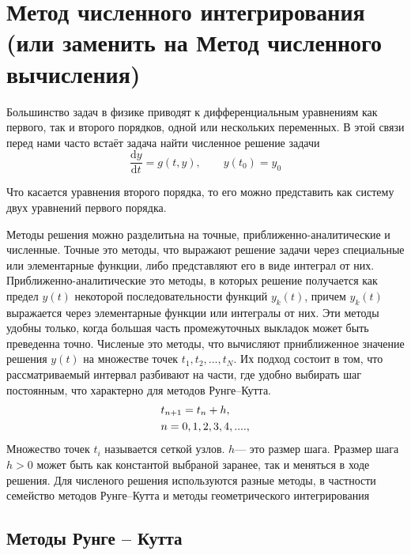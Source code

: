 \documentclass[a4paper,12pt]{article}
\newcommand{\dd}{\mathrm{d}}
\begin{document}


	\section{Метод численного интегрирования (или заменить на Метод численного вычисления)}
	
	Большинство задач в физике приводят к дифференциальным уравнениям как первого, так и второго порядков, одной или нескольких переменных. В этой связи перед нами часто встаёт задача найти численное решение задачи
	\begin{equation}\label{eq:9} 
		\frac{\dd y}{\dd t}=g(t,y),\qquad y(t_0)=y_0
	\end{equation}

	Что касается уравнения второго порядка, то его можно представить как систему
двух уравнений первого порядка.

	Методы решения  можно разделитьна на точные, приближенно-аналитические и численные. Точные это методы, что выражают решение задачи через специальные или элементарные функции, либо представляют его в виде интеграл от них.  Приближенно-аналитические это методы,  в которых решение получается как предел \(y(t)\) некоторой последовательности функций \(y_k(t)\), причем \(y_k(t)\) выражается через элементарные функции или интегралы от них. Эти методы удобны только, когда большая часть промежуточных выкладок может быть преведенна точно. Численые это методы, что вычисляют прниближенное значение решения \(y(t)\) на множестве точек \(t_1,t_2,...,t_N\). Их подход состоит в том, что рассматриваемый интервал разбивают на части, где удобно выбирать шаг постоянным, что характерно для методов Рунге–Кутта.
	\begin{equation}\label{eq:10} 
		\begin{lgathered}
			t_{n+1}=t_n+h,\\
			n=0, 1, 2, 3, 4, ....,\\
		\end{lgathered}
	\end{equation}
	Множество точек \(t_i\) называется сеткой узлов.  \(h\)--- это размер шага.  Рразмер шага \(h>0\) может быть как константой выбраной заранее, так и меняться в ходе решения. Для численого решения используются разные методы, в частности семейство методов Рунге–Кутта и методы геометрического интегрирования

	\subsection{Методы Рунге – Кутта}
	
\end{document}
